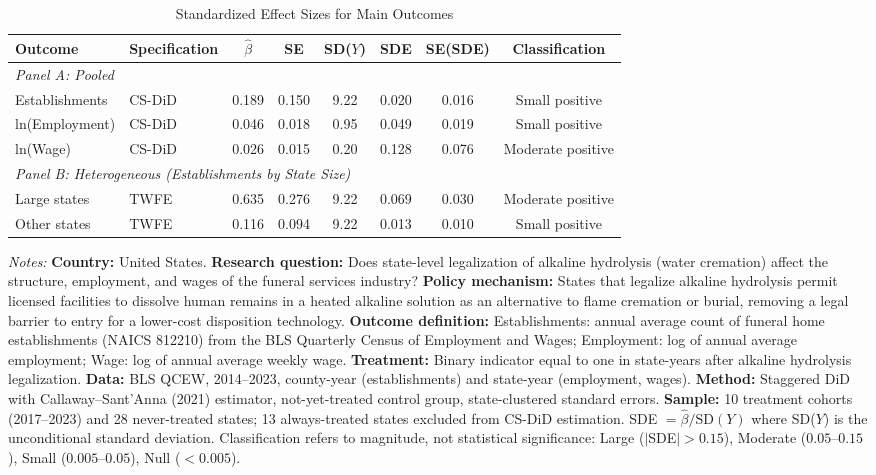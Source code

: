 \begin{table}[H]
\centering
\caption{Standardized Effect Sizes for Main Outcomes}
\label{tab:sde}
\begin{threeparttable}
\footnotesize
\begin{tabular}{llcccccc}
\toprule
Outcome & Specification & $\hat{\beta}$ & SE & SD($Y$) & SDE & SE(SDE) & Classification \\
\midrule
\multicolumn{8}{l}{\textit{Panel A: Pooled}} \\
Establishments & CS-DiD & 0.189 & 0.150 & 9.22 & 0.020 & 0.016 & Small positive \\
ln(Employment) & CS-DiD & 0.046 & 0.018 & 0.95 & 0.049 & 0.019 & Small positive \\
ln(Wage) & CS-DiD & 0.026 & 0.015 & 0.20 & 0.128 & 0.076 & Moderate positive \\
\midrule
\multicolumn{8}{l}{\textit{Panel B: Heterogeneous (Establishments by State Size)}} \\
Large states & TWFE & 0.635 & 0.276 & 9.22 & 0.069 & 0.030 & Moderate positive \\
Other states & TWFE & 0.116 & 0.094 & 9.22 & 0.013 & 0.010 & Small positive \\
\bottomrule
\end{tabular}
\begin{tablenotes}[flushleft]
\small
\item \textit{Notes:} \textbf{Country:} United States. \textbf{Research question:} Does state-level legalization of alkaline hydrolysis (water cremation) affect the structure, employment, and wages of the funeral services industry? \textbf{Policy mechanism:} States that legalize alkaline hydrolysis permit licensed facilities to dissolve human remains in a heated alkaline solution as an alternative to flame cremation or burial, removing a legal barrier to entry for a lower-cost disposition technology. \textbf{Outcome definition:} Establishments: annual average count of funeral home establishments (NAICS 812210) from the BLS Quarterly Census of Employment and Wages; Employment: log of annual average employment; Wage: log of annual average weekly wage. \textbf{Treatment:} Binary indicator equal to one in state-years after alkaline hydrolysis legalization. \textbf{Data:} BLS QCEW, 2014--2023, county-year (establishments) and state-year (employment, wages). \textbf{Method:} Staggered DiD with Callaway--Sant'Anna (2021) estimator, not-yet-treated control group, state-clustered standard errors. \textbf{Sample:} 10 treatment cohorts (2017--2023) and 28 never-treated states; 13 always-treated states excluded from CS-DiD estimation. SDE $= \hat{\beta} / \text{SD}(Y)$ where SD($Y$) is the unconditional standard deviation. Classification refers to magnitude, not statistical significance: Large ($|$SDE$| > 0.15$), Moderate ($0.05$--$0.15$), Small ($0.005$--$0.05$), Null ($< 0.005$).
\end{tablenotes}
\end{threeparttable}
\end{table}

